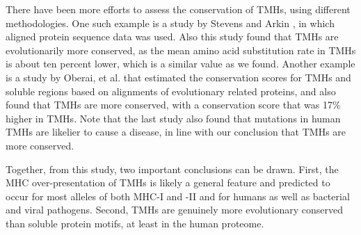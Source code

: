 \documentclass[utf8]{frontiersSCNS} %
\begin{document}
There have been more efforts to assess the conservation of TMHs,
using different methodologies.
One such example is a study by Stevens and Arkin \citep{stevens2001substitution}, 
in which aligned protein sequence data was used.
Also this study found that TMHs are evolutionarily more conserved,
as the mean amino acid substitution rate in TMHs is about ten
percent lower,
which is a similar value as we found.
Another example is a study by Oberai, et al. \citep{oberai2009structural} that estimated the conservation
scores for TMHs and soluble regions based on 
alignments of evolutionary related proteins,
and also found that TMHs are more conserved, 
with a conservation score that was 17\% higher in 
TMHs.
Note that the last study also found that mutations in human TMHs are likelier to cause
a disease, in line with our conclusion that TMHs are more conserved.


Together, from this study, two important conclusions can be drawn. 
First, the MHC over-presentation of TMHs is likely a general feature 
and predicted to occur for most alleles of both MHC-I and -II 
and for humans as well as bacterial and viral pathogens. 
Second, TMHs are genuinely more evolutionary conserved than soluble protein motifs, 
at least in the human proteome. 
\end{document}
